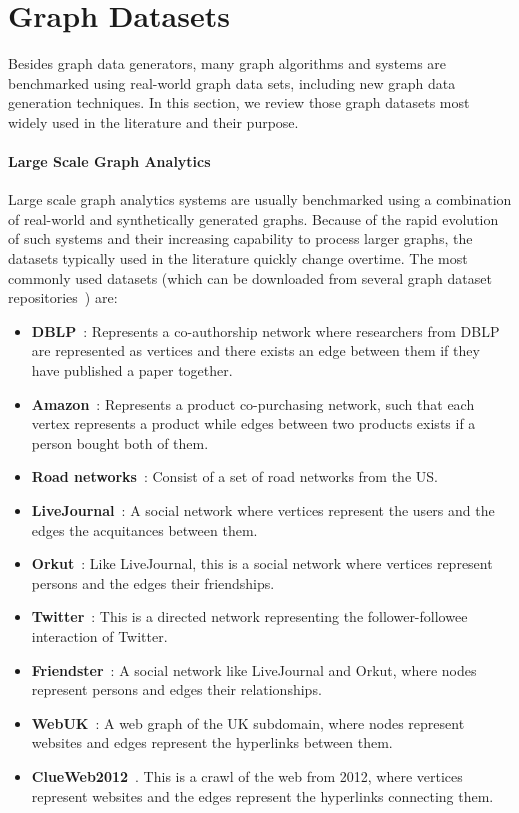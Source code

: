 \section{Graph Datasets}
\label{sec:data_sets}

Besides graph data generators, many graph algorithms and systems are benchmarked
using real-world graph data sets, including new graph data generation
techniques. In this section, we review those graph datasets most widely used in
the literature and their purpose.


\paragraph{Large Scale Graph Analytics}

Large scale graph analytics systems are usually benchmarked using a combination of
real-world and synthetically generated graphs. Because of the rapid evolution of such
systems and their increasing capability to process larger graphs, the datasets
typically used  in the literature quickly change overtime. The most commonly
used datasets (which can be downloaded from several graph dataset
repositories~\cite{snapnets,lawalgo}) are:
\begin{itemize}
  \item \textbf{DBLP}~\cite{yang2015defining}: Represents a co-authorship network where
    researchers from DBLP are represented as vertices and there exists an edge
    between them if they have published a paper together.
  \item \textbf{Amazon}~\cite{yang2015defining}: Represents a product co-purchasing
    network, such that each vertex represents a product while edges between two products
    exists if a person bought both of them.
  \item \textbf{Road networks}~\cite{leskovec2009community}: Consist of a set of road
    networks from the US.
  \item \textbf{LiveJournal}~\cite{yang2015defining}: A social network where vertices
    represent the users and the edges the acquitances between them.
  \item \textbf{Orkut}~\cite{yang2015defining}: Like LiveJournal, this is a social network
    where vertices represent persons and the edges their friendships.
  \item \textbf{Twitter}~\cite{kwak2010twitter}: This is a directed network representing
    the follower-followee interaction of Twitter.
  \item \textbf{Friendster}~\cite{yang2015defining}: A social network like LiveJournal and
    Orkut, where nodes represent persons and edges their relationships.
  \item \textbf{WebUK}~\cite{delis}: A web graph of the UK subdomain, where nodes represent
    websites and edges represent the hyperlinks between them.
  \item \textbf{ClueWeb2012}~\cite{clueweb}. This is a crawl of the web from 2012, where
    vertices represent websites and the edges represent the hyperlinks connecting them.
\end{itemize}

